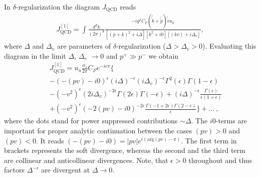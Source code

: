 \documentclass[a4paper, amsfonts, amssymb, amsmath, reprint, showkeys, nofootinbib, twoside]{revtex4-1}
\newcommand{\nn}{\nonumber}
\renewcommand{\(}{\left(}
\renewcommand{\)}{\right)}
\renewcommand{\[}{\left[}
\renewcommand{\]}{\right]}
\newcommand{\fnot}[1]{\not{\! #1}}
\begin{document}
In $\delta$-regularization the diagram $J_{\text{QCD}}$ reads
\begin{eqnarray}\nn
J^{[1]}_{\text{QCD}}=\int\frac{d^dk}{(2\pi)^d}\frac{-ig^2C_F(\fnot k+\fnot p)\fnot v u_{\bar n}}{[(p+k)^2+i\Delta][k^2+i0][(kv)+i\Delta_v]},
\end{eqnarray}
where $\Delta$ and $\Delta_v$ are parameters of $\delta$-regularization ($\Delta>\Delta_v>0$). Evaluating this diagram in the limit $\Delta$, $\Delta_v$ $\to0$ and $p^+\gg p^-$ we obtain
\begin{eqnarray}\label{nlo:J}
&& J^{[1]}_{\text{QCD}}=u_{\bar n}\frac{\alpha_s}{2\pi}C_F e^{-i\epsilon \pi}\Big\{
\\\nn && -(-(pv)-i0)^{\epsilon}(i\Delta)^{-\epsilon}(i\Delta_v)^{-\epsilon}\Gamma^2(\epsilon)\Gamma(1-\epsilon)
\\\nn && -(-v^2)^{\epsilon}(2i\Delta_v)^{-2\epsilon}\Gamma(2\epsilon)\Gamma(-\epsilon)
+(i\Delta)^{-\epsilon}\frac{\Gamma(\epsilon)}{\epsilon(1+\epsilon)}
\\\nn && +(-v^2)^{\epsilon}(-2(pv)- i0)^{-2\epsilon}\frac{\Gamma(-1+2\epsilon)\Gamma(2-\epsilon)}{\epsilon}\Big\}+...~,
\end{eqnarray}
where the dots stand for power suppressed contributions $\sim \Delta$. The $i0$-terms are important for proper analytic continuation between the cases $(pv)>0$ and $(pv)<0$. It reads $(-(pv)- i0)=|pv|e^{i(\text{arg}(pv)-\pi)}$. The first term in brackets represents the soft divergence, whereas the second and the third term are collinear and anticollinear divergences. Note, that $\epsilon>0$ throughout and thus factors $\Delta^{-\epsilon}$ are divergent at $\Delta\to0$. 
\end{document}
